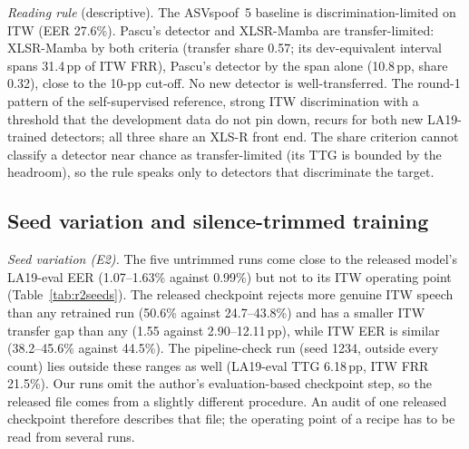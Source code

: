 \documentclass[review,authoryear]{elsarticle}
\newcommand{\todo}[1]{\textcolor{red}{[#1]}}
\newcommand{\gentab}[1]{\IfFileExists{gen/#1.tex}{}{\todo{generated table \detokenize{#1} pending}}}
\newcommand{\tauE}{\tau^{*}_{\mathrm{EER}}}
\begin{document}
\begin{table}[!t]
\caption{R2-H4 by condition: number of the four primary round-1 models for which each registered one-sided test rejects
after Holm correction within the condition (speaker-cluster bootstrap, \(B=10{,}000\), at \(\tauE\), paired clean and
stressed clips). The rule requires the combined test for at least three models.}
\label{tab:r2h4}
\centering
\footnotesize
\gentab{r2_h4}
\end{table}

\emph{Reading rule} (descriptive). The ASVspoof~5 baseline is discrimination-limited on ITW (EER 27.6\%). Pascu's
detector and XLSR-Mamba are transfer-limited: XLSR-Mamba by both criteria (transfer share 0.57; its dev-equivalent
interval spans 31.4\,pp of ITW FRR), Pascu's detector by the span alone (10.8\,pp, share 0.32), close to the 10-pp
cut-off. No new detector is well-transferred. The round-1 pattern of the self-supervised reference, strong ITW
discrimination with a threshold that the development data do not pin down, recurs for both new LA19-trained detectors;
all three share an XLS-R front end. The share criterion cannot classify a detector near chance as transfer-limited (its
TTG is bounded by the headroom), so the rule speaks only to detectors that discriminate the target.

\subsection{Seed variation and silence-trimmed training}
\label{sec:r2seeds}
\emph{Seed variation (E2).} The five untrimmed runs come close to the released model's LA19-eval EER (1.07--1.63\%
against 0.99\%) but not to its ITW operating point (Table~\ref{tab:r2seeds}). The released checkpoint rejects more genuine
ITW speech than any retrained run (50.6\% against 24.7--43.8\%) and has a smaller ITW transfer gap than any (1.55 against
2.90--12.11\,pp), while ITW EER is similar (38.2--45.6\% against 44.5\%). The pipeline-check run (seed 1234, outside every
count) lies outside these ranges as well (LA19-eval TTG 6.18\,pp, ITW FRR 21.5\%). Our runs omit the author's
evaluation-based checkpoint step, so the released file comes from a slightly different procedure. An audit of one released
checkpoint therefore describes that file; the operating point of a recipe has to be read from several runs.
\end{document}
